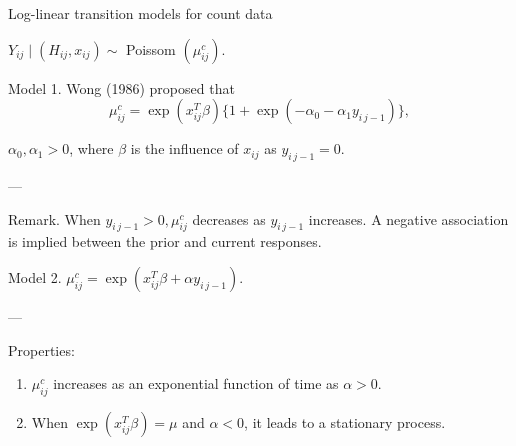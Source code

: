 \documentclass[UTF8,a4paper,10pt]{article}
\begin{document}
\begin{Problem}[]{Log-linear transition models for count data}


 
$Y_{ij} \mid\left(H_{ij}, x_{ij}\right) \sim$ Poissom $\left(\mu^c_{ij}\right)$.

\dotfill

Model 1. Wong (1986) proposed that $$\mu_{ij}^c=\exp \left(x_{ij}^T\beta\right) \{1+\exp \left(-\alpha_0-\alpha_1 y_{i\,j-1}\right)\},$$ 

$\alpha_0, \alpha_1>0$, where $\beta$ is the influence of $x_{ij}$ as $y_{i\,j-1}=0$.

---

Remark. When $y_{i\,j-1}>0, \mu_{ij}^c$ decreases as $y_{i\,j-1}$ increases. A negative association is implied between the prior and current responses.

\dotfill

Model 2. $\mu_{ij}^c=\exp \left(x_{ij}^T\beta+\alpha y_{i\,j-1}\right)$.

---

Properties: 
\begin{enumerate}
  \item $\mu_{ij}^c$ increases as an exponential function of time as $\alpha>0$.
  \item When $\exp \left(x_{ij}^T \beta\right)=\mu$ and $\alpha<0$, it leads to a stationary process.
\end{enumerate}


\dotfill





\end{Problem}


\pagebreak
\end{document}
